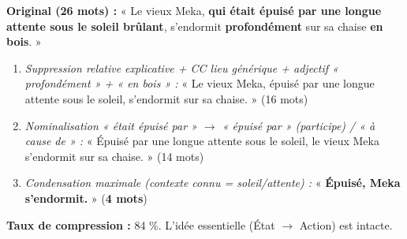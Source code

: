 \documentclass[11pt]{article}
\begin{document}
\begin{exemplebox}
\textbf{Original (26 mots) :} « Le vieux Meka, \textbf{qui était épuisé par une longue attente sous le soleil brûlant}, s'endormit \textbf{profondément} sur sa chaise \textbf{en bois}. »

\begin{enumerate}
\item \textit{Suppression relative explicative + CC lieu générique + adjectif « profondément » + « en bois » :} « Le vieux Meka, épuisé par une longue attente sous le soleil, s'endormit sur sa chaise. » (16 mots)
\item \textit{Nominalisation « était épuisé par » $\rightarrow$ « épuisé par » (participe) / « à cause de » :} « Épuisé par une longue attente sous le soleil, le vieux Meka s'endormit sur sa chaise. » (14 mots)
\item \textit{Condensation maximale (contexte connu = soleil/attente) :} « \textbf{Épuisé, Meka s'endormit.} » (\textbf{4 mots})
\end{enumerate}
\textbf{Taux de compression :} 84 \%. L'idée essentielle (État $\rightarrow$ Action) est intacte.
\end{exemplebox}
\end{document}
